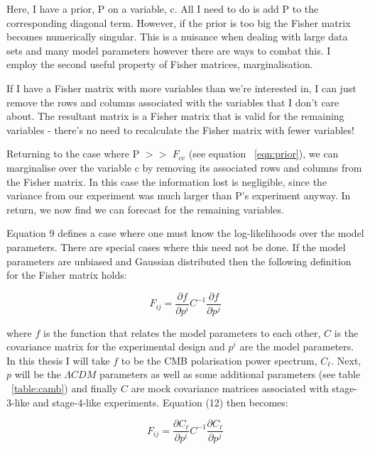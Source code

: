 Here, I have a prior, P on a variable, c. All I need to do is add P to the corresponding diagonal term. However, if the prior is too big the Fisher matrix becomes numerically singular. This is a nuisance when dealing with large data sets and many model parameters however there are ways to combat this. I employ the second useful property of Fisher matrices, marginalisation.

If I have a Fisher matrix with more variables than we're interested in, I can just remove the rows and columns associated with the variables that I don't care about\cite{Albrecht:2006um}. The resultant matrix is a Fisher matrix that is valid for the remaining variables - there's no need to recalculate the Fisher matrix with fewer variables!

Returning to the case where P $>>$ $F_{cc}$ (see equation ~\ref{eqn:prior}), we can marginalise over the variable c by removing its associated rows and columns from the Fisher matrix. In this case the information lost is negligible, since the variance from our experiment was much larger than P's experiment anyway. In return, we now find we can forecast for the remaining variables.

Equation 9 defines a case where one must know the log-likelihoods over the model parameters. There are special cases where this need not be done. If the model parameters are unbiased and Gaussian distributed then the following definition for the Fisher matrix holds:

\begin{equation}
\label{eqn:fishermatrix}
F_{ij} = \frac{\partial f}{\partial p^i} C^{-1} \frac{\partial f}{\partial p^j}
\end{equation}

where $f$ is the function that relates the model parameters to each other, $C$ is the covariance matrix for the experimental design and $p^{i}$ are the model parameters\cite{Albrecht:2006um}. In this thesis I will take $f$ to be the CMB polarisation power spectrum, $C_{\ell}$. Next, ${p}$ will be the $\Lambda CDM$ parameters as well as some additional parameters (see table ~\ref{table:camb}) and finally $C$ are mock covariance matrices associated with stage-3-like and stage-4-like experiments. Equation (12) then becomes:

\begin{equation}
\label{eqn:clfisher}
F_{ij} = \frac{\partial C_{\ell}}{\partial p^i} C^{-1} \frac{\partial C_{\ell}}{\partial p^j}
\end{equation}

